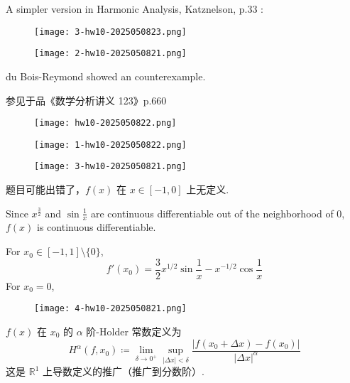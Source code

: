 A simpler version in Harmonic Analysis, Katznelson, p.33 :
\begin{figure}[H]
\centering
\texttt{[image: 3-hw10-2025050823.png]}
\label{}
\end{figure}

\begin{exercise}
\begin{figure}[H]
\centering
\texttt{[image: 2-hw10-2025050821.png]}
\label{}
\end{figure}
\end{exercise}
du Bois-Reymond showed an counterexample.

\begin{note}
参见于品《数学分析讲义 123》p.660
\begin{figure}[H]
\centering
\texttt{[image: hw10-2025050822.png]}
\label{}
\end{figure}
\end{note}
\begin{figure}[H]
\centering
\texttt{[image: 1-hw10-2025050822.png]}
\label{}
\end{figure}

\begin{exercise}
\begin{figure}[H]
\centering
\texttt{[image: 3-hw10-2025050821.png]}
\label{}
\end{figure}
\end{exercise}
\begin{note}
题目可能出错了，$f(x)$ 在 $x\in[-1,0]$ 上无定义.
\end{note}
Since $x^{\frac{3}{2}}$ and $\sin\frac{1}{x}$ are continuous differentiable out of the neighborhood of 0, $f(x)$ is continuous differentiable.

For $x_0\in[-1,1]\setminus \{ 0 \}$,
\[
f'(x_0)=\frac{3}{2}x^{1/2 }\sin\frac{1}{x}-x^{-1/2 }\cos\frac{1}{x}
\]
For $x_0=0$,

\begin{exercise}
\begin{figure}[H]
\centering
\texttt{[image: 4-hw10-2025050821.png]}
\label{}
\end{figure}
\end{exercise}
$f(x)$ 在 $x_0$ 的 $\alpha$ 阶-Holder 常数定义为
\[
H^{\alpha}(f,x_0)\coloneqq \lim_{ \delta \to 0^{+} } \sup_{\lvert \Delta x \rvert <\delta}\frac{\lvert f(x_0+\Delta x)-f(x_0) \rvert }{\lvert \Delta x \rvert ^{\alpha}}
\]
这是 $\mathbb{R}^{1}$ 上导数定义的推广（推广到分数阶）.

